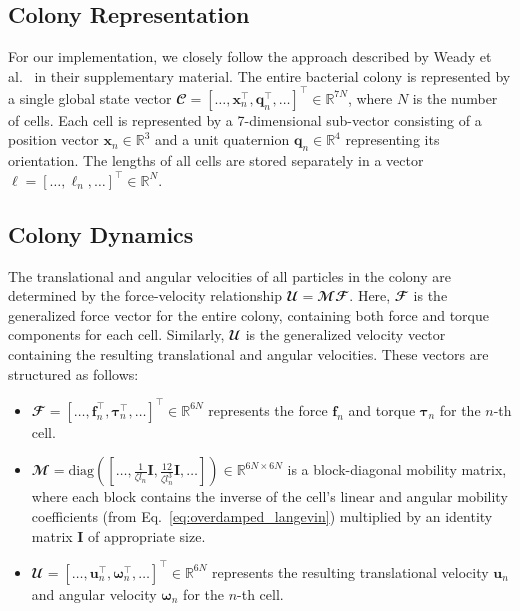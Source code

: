 \documentclass[conference]{IEEEtran}
\begin{document}
\subsection{Colony Representation}

For our implementation, we closely follow the approach described by Weady et al.~\cite{Weady2024} in their supplementary material. The entire bacterial colony is represented by a single global state vector $\mathbfcal{C} = [\dots, \mathbf{x}_n^\top, \mathbf{q}_n^\top, \dots]^\top \in \mathbb{R}^{7N}$, where $N$ is the number of cells. Each cell is represented by a 7-dimensional sub-vector consisting of a position vector $\mathbf{x}_n \in \mathbb{R}^3$ and a unit quaternion $\mathbf{q}_n \in \mathbb{R}^4$ representing its orientation. The lengths of all cells are stored separately in a vector $\boldsymbol{\ell} = [\dots, \ell_n, \dots]^\top \in \mathbb{R}^{N}$.

\subsection{Colony Dynamics}

The translational and angular velocities of all particles in the colony are determined by the force-velocity relationship $\mathbfcal{U} = \mathbfcal{M} \mathbfcal{F}$. Here, $\mathbfcal{F}$ is the generalized force vector for the entire colony, containing both force and torque components for each cell. Similarly, $\mathbfcal{U}$ is the generalized velocity vector containing the resulting translational and angular velocities. These vectors are structured as follows:

\begin{itemize}
    \item
          $\mathbfcal{F} = [\dots, \mathbf{f}_n^\top, \boldsymbol{\tau}_n^\top, \dots]^\top \in \mathbb{R}^{6N}$ represents the force $\mathbf{f}_n$ and torque $\boldsymbol{\tau}_n$ for the $n$-th cell.
    \item
          $\mathbfcal{M} = \text{diag}([\dots, \frac{1}{\zeta l_n}\mathbf{I}, \frac{12}{\zeta l_n^3}\mathbf{I}, \dots]) \in \mathbb{R}^{6N \times 6N}$ is a block-diagonal mobility matrix, where each block contains the inverse of the cell's linear and angular mobility coefficients (from Eq.~\ref{eq:overdamped_langevin}) multiplied by an identity matrix $\mathbf{I}$ of appropriate size.
    \item
          $\mathbfcal{U} = [\dots, \mathbf{u}_n^\top, \boldsymbol{\omega}_n^\top, \dots]^\top \in \mathbb{R}^{6N}$ represents the resulting translational velocity $\mathbf{u}_n$ and angular velocity $\boldsymbol{\omega}_n$ for the $n$-th cell.
\end{itemize}
\end{document}
